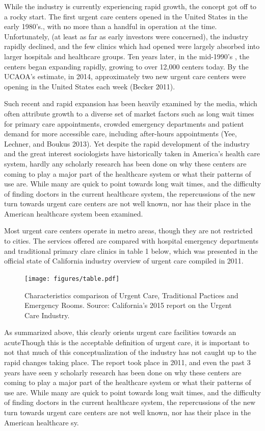 \documentclass[12pt,twoside]{reedthesis}
\begin{document}
  While the industry is currently experiencing rapid growth, the concept
  got off to a rocky start. The first urgent care centers opened in the
  United States in the early 1980's., with no more than a handful in
  operation at the time. Unfortunately, (at least as far as early
  investors were concerned), the industry rapidly declined, and the few
  clinics which had opened were largely absorbed into larger hospitals and
  healthcare groups. Ten years later, in the mid-1990's , the centers
  began expanding rapidly, growing to over 12,000 centers today. By the
  UCAOA's estimate, in 2014, approximately two new urgent care centers
  were opening in the United States each week (Becker 2011).
  
  Such recent and rapid expansion has been heavily examined by the media,
  which often attribute growth to a diverse set of market factors such as
  long wait times for primary care appointments, crowded emergency
  departments and patient demand for more accessible care, including
  after-hours appointments (Yee, Lechner, and Boukus 2013). Yet despite
  the rapid development of the industry and the great interest
  sociologists have historically taken in America's health care system,
  hardly any scholarly research has been done on why these centers are
  coming to play a major part of the healthcare system or what their
  patterns of use are. While many are quick to point towards long wait
  times, and the difficulty of finding doctors in the current healthcare
  system, the repercussions of the new turn towards urgent care centers
  are not well known, nor has their place in the American healthcare
  system been examined.
  
  Most urgent care centers operate in metro areas, though they are not
  restricted to cities. The services offered are compared with hospital
  emergency departments and traditional primary clare clinics in table 1
  below, which was presented in the official state of California industry
  overview of urgent care compiled in 2011.
  
  \begin{figure}[h!]
  \centering
  \texttt{[image: figures/table.pdf]}
  \caption[Comparison of the Characteristics of Three Care Options]{\small{Characteristics comparison of Urgent Care, Traditional Pactices and Emergency Rooms. Source: California's 2015 report on the Urgent Care Industry.}}
  \label{fig:tab1}
  \end{figure}
  
  As summarized above, this clearly orients urgent care facilities towards
  an acuteThough this is the acceptable definition of urgent care, it is
  important to not that much of this conceptualization of the industry has
  not caught up to the rapid changes taking place. The report took place
  in 2011, and even the past 3 years have seen y scholarly research has
  been done on why these centers are coming to play a major part of the
  healthcare system or what their patterns of use are. While many are
  quick to point towards long wait times, and the difficulty of finding
  doctors in the current healthcare system, the repercussions of the new
  turn towards urgent care centers are not well known, nor has their place
  in the American healthcare sy.
  
\end{document}
